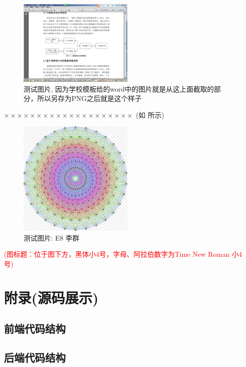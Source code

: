 \documentclass[a4paper]{article}
\begin{document}
\begin{figure}[H]
	\centering
	\includegraphics[width=0.5\textwidth]{fig/testmindmap}
	\caption{测试图片, 因为学校模板给的word中的图片就是从这上面截取的部分，所以另存为PNG之后就是这个样子}
	\label{testfig}
\end{figure}
$ \times\times\times\times\times\times\times\times\times\times\times\times\times\times\times\times\times\times\times\times $  (如 所示)
\begin{figure}[H]
	\centering
	\includegraphics[width=0.5\textwidth]{fig/E8Petrie}
	\caption{测试图片: E8 李群}
	\label{E8}
\end{figure}
\textcolor{red}{(图标题：位于图下方，黑体小4号，字母、阿拉伯数字为Time New Roman 小4号)}

\sectionbreak
\clearpage
{}
{}

\label{bibtexref}
\clearpage
\appendix
{}
{}
\section*{附录(源码展示)}
\renewcommand{\thesubsection}{\thesection\Alph{subsection}}
\subsection{前端代码结构}
\subsection{后端代码结构}
\end{document}
